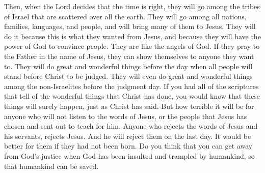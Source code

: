 Then, when the Lord decides that the time is right, they will go among the tribes of Israel that are scattered over all the earth. They will go among all nations, families, languages, and people, and will bring many of them to Jesus. They will do it because this is what they wanted from Jesus, and because they will have the power of God to convince people.
\bverse \iffalse And they are as the angels of God, and if they shall pray unto the Father in the name of Jesus they can show themselves unto whatsoever man it seemeth them good. \fi
They are like the angels of God. If they pray to the Father in the name of Jesus, they can show themselves to anyone they want to.
\bverse \iffalse Therefore, great and marvelous works shall be wrought by them, before the great and coming day when all people must surely stand before the judgment-seat of Christ; \fi
They will do great and wonderful things before the day when all people will stand before Christ to be judged.
\bverse \iffalse Yea even among the Gentiles shall there be a great and marvelous work wrought by them, before that judgment day. \fi
They will even do great and wonderful things among the non-Israelites before the judgment day.
\bverse \iffalse And if ye had all the scriptures which give an account of all the marvelous works of Christ, ye would, according to the words of Christ, know that these things must surely come. \fi
If you had all of the scriptures that tell of the wonderful things that Christ has done, you would know that these things will surely happen, just as Christ has said.
\bverse \iffalse And wo be unto him that will not hearken unto the words of Jesus, and also to them whom he hath chosen and sent among them; for whoso receiveth not the words of Jesus and the words of those whom he hath sent receiveth not him; and therefore he will not receive them at the last day; \fi
But how terrible it will be for anyone who will not listen to the words of Jesus, or the people that Jesus has chosen and sent out to teach for him. Anyone who rejects the words of Jesus and his servants, rejects Jesus. And he will reject them on the last day.
\bverse \iffalse And it would be better for them if they had not been born.  For do ye suppose that ye can get rid of the justice of an offended God, who hath been trampled under feet of men, that thereby salvation might come? \fi
It would be better for them if they had not been born. Do you think that you can get away from God's justice when God has been insulted and trampled by humankind, so that humankind can be saved.
